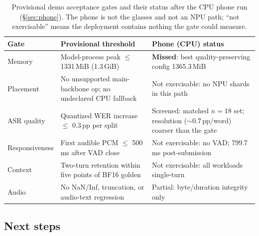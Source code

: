 \documentclass[10pt,twocolumn,letterpaper]{article}
\begin{document}
\begin{table}[t]
\centering
\footnotesize
\setlength{\tabcolsep}{5pt}
\caption{Provisional demo acceptance gates and their status after the CPU
phone run (\S\ref{sec:phone}). The phone is not the glasses and not an NPU
path; ``not exercisable'' means the deployment contains nothing the gate could
measure.}
\label{tab:gates}
\begin{tabular}{@{}p{}p{}p{}@{}}
\toprule
\textbf{Gate} & \textbf{Provisional threshold} & \textbf{Phone (CPU) status} \\
\midrule
Memory & Model-process peak $\leq$ 1331\,MiB (1.3\,GiB) & \textcolor{warn}{\textbf{Missed}}: best quality-preserving config 1365.3\,MiB \\
\addlinespace[2pt]
Placement & No unsupported main-backbone op; no undeclared CPU fallback & Not exercisable: no NPU shards in this path \\
\addlinespace[2pt]
ASR quality & Quantized WER increase $\leq$ 0.3\,pp per split & Screened: matched $n{=}18$ set; resolution ($\sim$0.7\,pp/word) coarser than the gate \\
\addlinespace[2pt]
Responsiveness & First audible PCM $\leq$ 500\,ms after VAD close & Not exercisable: no VAD; 799.7\,ms post-submission \\
\addlinespace[2pt]
Context & Two-turn retention within five points of BF16 golden & Not exercisable: all workloads single-turn \\
\addlinespace[2pt]
Audio & No NaN/Inf, truncation, or audio-text regression & Partial: byte/duration integrity only \\
\bottomrule
\end{tabular}
\end{table}

\subsection{Next steps}
\end{document}
